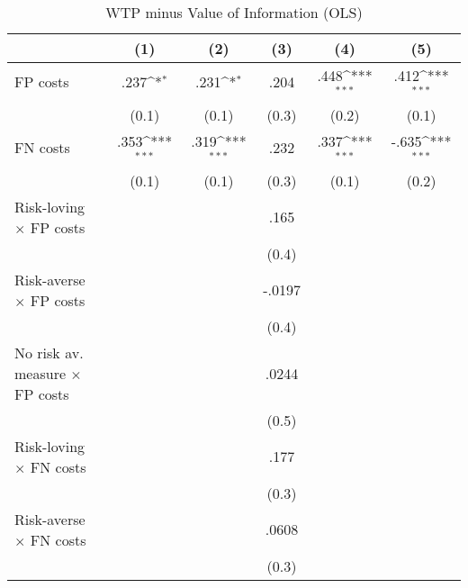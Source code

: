 \begin{table}[htbp]\centering
\def\sym#1{\ifmmode^{#1}\else\(^{#1}\)\fi}
\caption{WTP minus Value of Information (OLS)}\label{tab:wtp_ols}
\begin{tabular}{l*{5}{c}}
\hline\hline
                &\multicolumn{1}{c}{(1)}&\multicolumn{1}{c}{(2)}&\multicolumn{1}{c}{(3)}&\multicolumn{1}{c}{(4)}&\multicolumn{1}{c}{(5)}\\
\hline
FP costs        &     .237\sym{*}  &     .231\sym{*}  &     .204         &     .448\sym{***}&     .412\sym{***}\\
                &    (0.1)         &    (0.1)         &    (0.3)         &    (0.2)         &    (0.1)         \\
FN costs        &     .353\sym{***}&     .319\sym{***}&     .232         &     .337\sym{***}&    -.635\sym{***}\\
                &    (0.1)         &    (0.1)         &    (0.3)         &    (0.1)         &    (0.2)         \\
Risk-loving $\times$ FP costs&                  &                  &     .165         &                  &                  \\
                &                  &                  &    (0.4)         &                  &                  \\
Risk-averse $\times$ FP costs&                  &                  &   -.0197         &                  &                  \\
                &                  &                  &    (0.4)         &                  &                  \\
No risk av. measure $\times$ FP costs&                  &                  &    .0244         &                  &                  \\
                &                  &                  &    (0.5)         &                  &                  \\
Risk-loving $\times$ FN costs&                  &                  &     .177         &                  &                  \\
                &                  &                  &    (0.3)         &                  &                  \\
Risk-averse $\times$ FN costs&                  &                  &    .0608         &                  &                  \\
                &                  &                  &    (0.3)         &                  &                  \\

\end{tabular}
\end{table}
